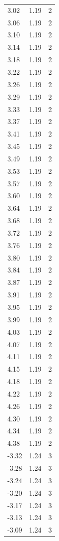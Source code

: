 \begin{longtable}{lrr}
  3.02 & 1.19 & 2 \\
  3.06 & 1.19 & 2 \\
  3.10 & 1.19 & 2 \\
  3.14 & 1.19 & 2 \\
  3.18 & 1.19 & 2 \\
  3.22 & 1.19 & 2 \\
  3.26 & 1.19 & 2 \\
  3.29 & 1.19 & 2 \\
  3.33 & 1.19 & 2 \\
  3.37 & 1.19 & 2 \\
  3.41 & 1.19 & 2 \\
  3.45 & 1.19 & 2 \\
  3.49 & 1.19 & 2 \\
  3.53 & 1.19 & 2 \\
  3.57 & 1.19 & 2 \\
  3.60 & 1.19 & 2 \\
  3.64 & 1.19 & 2 \\
  3.68 & 1.19 & 2 \\
  3.72 & 1.19 & 2 \\
  3.76 & 1.19 & 2 \\
  3.80 & 1.19 & 2 \\
  3.84 & 1.19 & 2 \\
  3.87 & 1.19 & 2 \\
  3.91 & 1.19 & 2 \\
  3.95 & 1.19 & 2 \\
  3.99 & 1.19 & 2 \\
  4.03 & 1.19 & 2 \\
  4.07 & 1.19 & 2 \\
  4.11 & 1.19 & 2 \\
  4.15 & 1.19 & 2 \\
  4.18 & 1.19 & 2 \\
  4.22 & 1.19 & 2 \\
  4.26 & 1.19 & 2 \\
  4.30 & 1.19 & 2 \\
  4.34 & 1.19 & 2 \\
  4.38 & 1.19 & 2 \\
  -3.32 & 1.24 & 3 \\
  -3.28 & 1.24 & 3 \\
  -3.24 & 1.24 & 3 \\
  -3.20 & 1.24 & 3 \\
  -3.17 & 1.24 & 3 \\
  -3.13 & 1.24 & 3 \\
  -3.09 & 1.24 & 3 \\

\end{longtable}
